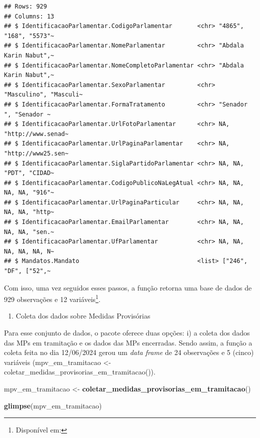 \documentclass{article}
\newenvironment{Shaded}{\begin{snugshade}}{\end{snugshade}}
\newcommand{\FunctionTok}[1]{\textcolor[rgb]{0.13,0.29,0.53}{\textbf{#1}}}
\newcommand{\NormalTok}[1]{#1}
\newcommand{\OtherTok}[1]{\textcolor[rgb]{0.56,0.35,0.01}{#1}}
\providecommand{\tightlist}{%
  \setlength{\itemsep}{0pt}\setlength{\parskip}{0pt}}
\begin{document}
\begin{verbatim}
## Rows: 929
## Columns: 13
## $ IdentificacaoParlamentar.CodigoParlamentar       <chr> "4865", "168", "5573"~
## $ IdentificacaoParlamentar.NomeParlamentar         <chr> "Abdala Karin Nabut",~
## $ IdentificacaoParlamentar.NomeCompletoParlamentar <chr> "Abdala Karin Nabut",~
## $ IdentificacaoParlamentar.SexoParlamentar         <chr> "Masculino", "Masculi~
## $ IdentificacaoParlamentar.FormaTratamento         <chr> "Senador ", "Senador ~
## $ IdentificacaoParlamentar.UrlFotoParlamentar      <chr> NA, "http://www.senad~
## $ IdentificacaoParlamentar.UrlPaginaParlamentar    <chr> NA, "http://www25.sen~
## $ IdentificacaoParlamentar.SiglaPartidoParlamentar <chr> NA, NA, "PDT", "CIDAD~
## $ IdentificacaoParlamentar.CodigoPublicoNaLegAtual <chr> NA, NA, NA, NA, "916"~
## $ IdentificacaoParlamentar.UrlPaginaParticular     <chr> NA, NA, NA, NA, "http~
## $ IdentificacaoParlamentar.EmailParlamentar        <chr> NA, NA, NA, NA, "sen.~
## $ IdentificacaoParlamentar.UfParlamentar           <chr> NA, NA, NA, NA, NA, N~
## $ Mandatos.Mandato                                 <list> ["246", "DF", ["52",~
\end{verbatim}

Com isso, uma vez seguidos esses passos, a função retorna uma base de
dados de 929 observações e 12 variáveis\footnote{Disponível em:}.

\begin{enumerate}
\def\labelenumi{\arabic{enumi}.}
\setcounter{enumi}{1}
\tightlist
\item
  Coleta dos dados sobre Medidas Provisórias
\end{enumerate}

Para esse conjunto de dados, o pacote oferece duas opções: i) a coleta
dos dados das MPs em tramitação e os dados das MPs encerradas. Sendo
assim, a função a coleta feita no dia 12/06/2024 gerou um \emph{data
frame} de 24 observações e 5 (cinco) variáveis (mpv\_em\_tramitacao
\textless- coletar\_medidas\_provisorias\_em\_tramitacao()).

\begin{Shaded}
\begin{Highlighting}[]
\NormalTok{mpv\_em\_tramitacao }\OtherTok{\textless{}{-}} \FunctionTok{coletar\_medidas\_provisorias\_em\_tramitacao}\NormalTok{()}

\FunctionTok{glimpse}\NormalTok{(mpv\_em\_tramitacao)}
\end{Highlighting}
\end{Shaded}
\end{document}
